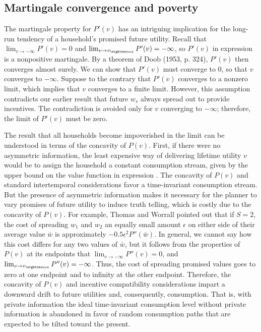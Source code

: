 \subsection{Martingale convergence and poverty}
%
The martingale property   for $P'(v)$ has an intriguing implication for the
long-run tendency of a household's promised future utility. Recall
that $\lim_{v\rightarrow -\infty}P'(v)=0$ and $\lim_{v\rightarrow
v_{\rm max}}P'(v)=-\infty$, so $P'(v)$ in expression
 is a nonpositive martingale. By a theorem of Doob
(1953, p. 324),
%
$P'(v)$ then converges almost surely.  We can show that
$P'(v)$ must converge to 0, so that $v$ converges to $-\infty$.
Suppose to the contrary that $P'(v)$ converges to a nonzero
limit, which implies that $v$ converges to a finite limit. However,
this assumption contradicts our earlier result that  future $w_s$
always spread out to provide  incentives. The contradiction
is  avoided only for $v$ converging to $-\infty$; therefore, the limit
of $P'(v)$ must be zero.

The result that all households become impoverished in the limit can be
understood in terms of  the concavity of $P(v)$. First, if there were no
asymmetric information, the least expensive way of delivering lifetime
utility $v$ would be to assign the household a constant consumption stream,
given by the upper bound on the value function in expression .
The concavity of $P(v)$ and standard intertemporal
considerations favor a time-invariant consumption stream. But the presence
of asymmetric information makes it necessary for the planner to vary
promises of future utility to induce truth telling, which is costly due
to the concavity of $P(v)$. For example,  Thomas and
Worrall pointed out that  if $S=2$, the cost of spreading $w_1$ and $w_2$ an equally small
amount $\epsilon$ on either side of their average value $\bar w$ is
approximately $-0.5 \epsilon^2 P''(\bar w)$.
In general, we cannot say how this cost differs for any two
values of $\bar w$, but it follows from the properties of $P(v)$
at its endpoints that
$\lim_{v\rightarrow -\infty}P''(v)=0$, and
$\lim_{v\rightarrow v_{\rm max}}P''(v)=-\infty$.
Thus, the cost of spreading promised values goes to zero at one
endpoint and to infinity at the other endpoint.
Therefore, the concavity of
$P(v)$ and incentive compatibility considerations impart  a downward
drift to future utilities and, consequently, consumption.
That is, with private information the ideal time-invariant consumption level without private information
 is abandoned in favor of random consumption paths that are expected to be  tilted
toward the present.

